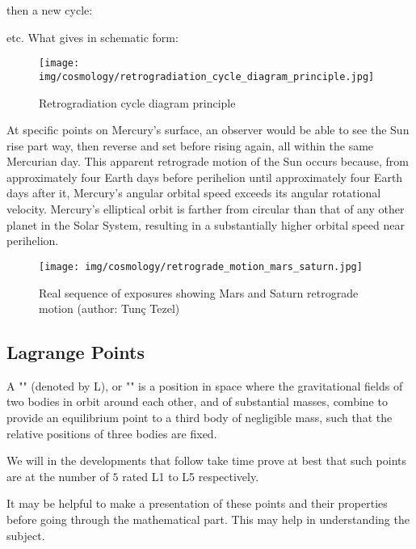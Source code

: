 	then a new cycle:
	
	etc. What gives in schematic form:
	\begin{figure}[H]
		\begin{center}
		\texttt{[image: img/cosmology/retrogradiation\_cycle\_diagram\_principle.jpg]}
		\caption[]{Retrogradiation cycle diagram principle}
		\end{center}	
	\end{figure}
	\begin{tcolorbox}[title=Remark,colframe=black,arc=10pt]
	At specific points on Mercury's surface, an observer would be able to see the Sun rise part way, then reverse and set before rising again, all within the same Mercurian day. This apparent retrograde motion of the Sun occurs because, from approximately four Earth days before perihelion until approximately four Earth days after it, Mercury's angular orbital speed exceeds its angular rotational velocity. Mercury's elliptical orbit is farther from circular than that of any other planet in the Solar System, resulting in a substantially higher orbital speed near perihelion.
	\end{tcolorbox}
	\begin{figure}[H]
		\centering
		\texttt{[image: img/cosmology/retrograde\_motion\_mars\_saturn.jpg]}
		\caption[Real sequence of exposures showing Mars and Saturn retrograde motion]{Real sequence of exposures showing Mars and Saturn retrograde motion (author: Tunç Tezel)}
	\end{figure}
	
	\pagebreak
	\subsection{Lagrange Points}
	A "" (denoted by L), or "" is a position in space where the gravitational fields of two bodies in orbit around each other, and of substantial masses, combine to provide an equilibrium point to a third body of negligible mass, such that the relative positions of three bodies are fixed.

	We will in the developments that follow take time prove at best that such points are at the number of $5$ rated L1 to L5 respectively.

	It may be helpful to make a presentation of these points and their properties before going through the mathematical part. This may help in understanding the subject.

